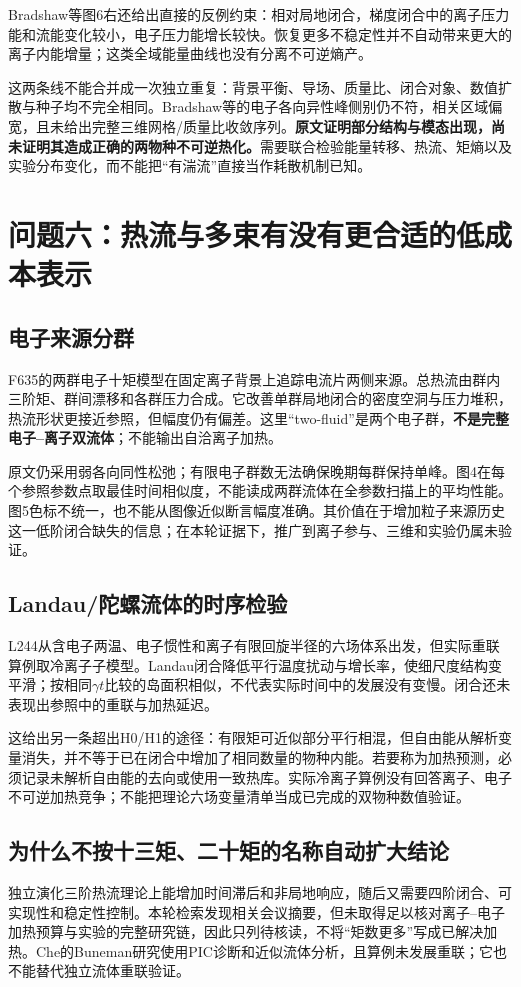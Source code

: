 Bradshaw等图6右还给出直接的反例约束：相对局地闭合，梯度闭合中的离子压力能和流能变化较小，电子压力能增长较快。恢复更多不稳定性并不自动带来更大的离子内能增量；这类全域能量曲线也没有分离不可逆熵产。

这两条线不能合并成一次独立重复：背景平衡、导场、质量比、闭合对象、数值扩散与种子均不完全相同。Bradshaw等的电子各向异性峰侧别仍不符，相关区域偏宽，且未给出完整三维网格/质量比收敛序列。\textbf{原文证明部分结构与模态出现，尚未证明其造成正确的两物种不可逆热化。}需要联合检验能量转移、热流、矩熵以及实验分布变化，而不能把“有湍流”直接当作耗散机制已知。

\section{问题六：热流与多束有没有更合适的低成本表示}
\subsection{电子来源分群}
F635的两群电子十矩模型在固定离子背景上追踪电流片两侧来源。总热流由群内三阶矩、群间漂移和各群压力合成。它改善单群局地闭合的密度空洞与压力堆积，热流形状更接近参照，但幅度仍有偏差。这里“two-fluid”是两个电子群，\textbf{不是完整电子--离子双流体}；不能输出自洽离子加热。\citep{F635}

原文仍采用弱各向同性松弛；有限电子群数无法确保晚期每群保持单峰。图4在每个参照参数点取最佳时间相似度，不能读成两群流体在全参数扫描上的平均性能。图5色标不统一，也不能从图像近似断言幅度准确。其价值在于增加粒子来源历史这一低阶闭合缺失的信息；在本轮证据下，推广到离子参与、三维和实验仍属未验证。

\subsection{Landau/陀螺流体的时序检验}
L244从含电子两温、电子惯性和离子有限回旋半径的六场体系出发，但实际重联算例取冷离子子模型。Landau闭合降低平行温度扰动与增长率，使细尺度结构变平滑；按相同$\gamma t$比较的岛面积相似，不代表实际时间中的发展没有变慢。闭合还未表现出参照中的重联与加热延迟。\citep{L244}

这给出另一条超出H0/H1的途径：有限矩可近似部分平行相混，但自由能从解析变量消失，并不等于已在闭合中增加了相同数量的物种内能。若要称为加热预测，必须记录未解析自由能的去向或使用一致热库。实际冷离子算例没有回答离子、电子不可逆加热竞争；不能把理论六场变量清单当成已完成的双物种数值验证。

\subsection{为什么不按十三矩、二十矩的名称自动扩大结论}
独立演化三阶热流理论上能增加时间滞后和非局地响应，随后又需要四阶闭合、可实现性和稳定性控制。本轮检索发现相关会议摘要，但未取得足以核对离子--电子加热预算与实验的完整研究链，因此只列待核读，不将“矩数更多”写成已解决加热。Che的Buneman研究使用PIC诊断和近似流体分析，且算例未发展重联；它也不能替代独立流体重联验证。\citep{Che2014Buneman}
